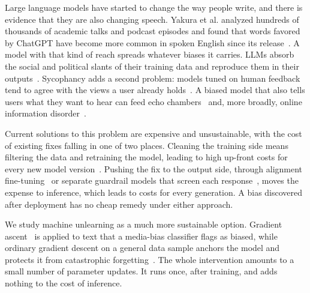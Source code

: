 \documentclass[runningheads]{llncs}
\begin{document}
Large language models have started to change the way people write, and there is evidence that they are also changing speech. Yakura et al.
analyzed hundreds of thousands of academic talks and podcast episodes and
found that words favored by ChatGPT have become more common in spoken
English since its release~\cite{yakura2024empirical}. A model with that
kind of reach spreads whatever biases it carries. LLMs absorb the social
and political slants of their training data and reproduce them in their
outputs~\cite{gallegos2024bias,feng2023pretraining}. Sycophancy adds a
second problem: models tuned on human feedback tend to agree with the
views a user already holds~\cite{sharma2023sycophancy}. A biased model
that also tells users what they want to hear can feed echo
chambers~\cite{cinelli2021echo} and, more broadly, online information
disorder~\cite{wardle2017information}.

Current solutions to this problem are expensive and unsustainable, with the cost of existing fixes falling in one of two places. Cleaning the
training side means filtering the data and retraining the model, leading to high up-front costs for every new model version~\cite{strubell2019energy,patterson2021carbon,bender2021dangers}.
Pushing the fix to the output side, through alignment
fine-tuning~\cite{ouyang2022training} or separate guardrail models that
screen each response~\cite{inan2023llamaguard}, moves the expense to
inference, which leads to costs for every generation. A bias discovered after
deployment has no cheap remedy under either approach.

We study machine unlearning as a much more sustainable option. Gradient
ascent~\cite{jang2023knowledge,yao2024large} is applied to text that a
media-bias classifier flags as biased, while ordinary gradient descent on
a general data sample anchors the model and protects it from catastrophic
forgetting~\cite{kirkpatrick2017overcoming}. The whole intervention
amounts to a small number of parameter updates. It runs once, after
training, and adds nothing to the cost of inference.
\end{document}
